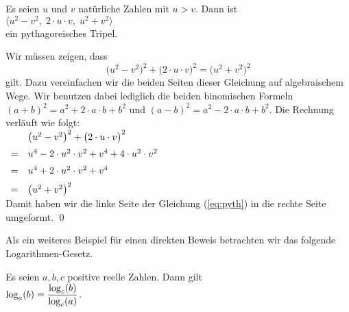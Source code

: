 \begin{Satz} 
Es seien $u$ und $v$ natürliche Zahlen mit $u > v$.  Dann ist
\\[0.2cm]
\hspace*{1.3cm}
$\bigl\langle u^2 - v^2,\; 2 \cdot u \cdot v,\; u^2 + v^2 \bigr\rangle$
\\[0.2cm]
ein pythagoreisches Tripel.  
\end{Satz}

\proof
Wir müssen zeigen, dass
\begin{equation}
  \label{eq:pyth}
\bigl( u^2 - v^2 \bigr)^2 + \bigl(2 \cdot u \cdot v \bigr)^2 = \bigl(u^2 + v^2\bigr)^2  
\end{equation}
gilt.  Dazu vereinfachen wir die beiden Seiten dieser Gleichung auf algebraischem Wege.
Wir benutzen dabei lediglich die beiden binomischen Formeln 
$(a + b)^2 = a^2 + 2 \cdot a \cdot b + b^2$ und
$(a - b)^2 = a^2 - 2 \cdot a \cdot b + b^2$.
Die Rechnung verläuft wie folgt:
\\[0.2cm]
\hspace*{1.3cm}
$
\begin{array}[t]{cl}
   & \bigl( u^2 - v^2 \bigr)^2 + \bigl(2 \cdot u \cdot v \bigr)^2 \\[0.2cm]
 = & u^4 - 2 \cdot u^2 \cdot v^2 + v^4  + 4 \cdot u^2 \cdot v^2 \\[0.2cm]
 = & u^4 + 2 \cdot u^2 \cdot v^2 + v^4 \\[0.2cm]
 = & \bigl(u^2 + v^2\bigr)^2 
\end{array}
$
\\[0.2cm]
Damit haben wir die linke Seite der Gleichung (\ref{eq:pyth}) in die rechte Seite umgeformt. \qed

Als ein weiteres Beispiel für einen direkten Beweis betrachten wir das folgende Logarithmen-Gesetz.

\begin{Satz}
  Es seien $a,b,c$ positive reelle Zahlen.  Dann gilt
  \\[0.2cm]
  \hspace*{1.3cm}
  $\displaystyle\log_a(b) = \frac{\log_c(b)}{\log_c(a)}$.
\end{Satz}

